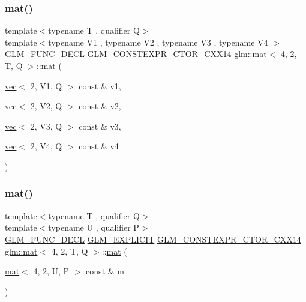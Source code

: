 \subsubsection{\texorpdfstring{mat()}{mat()}\hspace{0.1cm}{\footnotesize\ttfamily [8/21]}}
{\footnotesize\ttfamily template$<$typename T , qualifier Q$>$ \\
template$<$typename V1 , typename V2 , typename V3 , typename V4 $>$ \\
\mbox{\hyperlink{setup_8hpp_ab2d052de21a70539923e9bcbf6e83a51}{G\+L\+M\+\_\+\+F\+U\+N\+C\+\_\+\+D\+E\+CL}} \mbox{\hyperlink{setup_8hpp_a0900f9145e68bf6061b6f5e7be3fa751}{G\+L\+M\+\_\+\+C\+O\+N\+S\+T\+E\+X\+P\+R\+\_\+\+C\+T\+O\+R\+\_\+\+C\+X\+X14}} \mbox{\hyperlink{structglm_1_1mat}{glm\+::mat}}$<$ 4, 2, T, Q $>$\+::\mbox{\hyperlink{structglm_1_1mat}{mat}} (\begin{DoxyParamCaption}\item[{\mbox{\hyperlink{structglm_1_1vec}{vec}}$<$ 2, V1, Q $>$ const \&}]{v1,  }\item[{\mbox{\hyperlink{structglm_1_1vec}{vec}}$<$ 2, V2, Q $>$ const \&}]{v2,  }\item[{\mbox{\hyperlink{structglm_1_1vec}{vec}}$<$ 2, V3, Q $>$ const \&}]{v3,  }\item[{\mbox{\hyperlink{structglm_1_1vec}{vec}}$<$ 2, V4, Q $>$ const \&}]{v4 }\end{DoxyParamCaption})}

\mbox{\label{structglm_1_1mat_3_014_00_012_00_01_t_00_01_q_01_4_acae8a483921d714297536237a5f9013b}} 
\subsubsection{\texorpdfstring{mat()}{mat()}\hspace{0.1cm}{\footnotesize\ttfamily [9/21]}}
{\footnotesize\ttfamily template$<$typename T , qualifier Q$>$ \\
template$<$typename U , qualifier P$>$ \\
\mbox{\hyperlink{setup_8hpp_ab2d052de21a70539923e9bcbf6e83a51}{G\+L\+M\+\_\+\+F\+U\+N\+C\+\_\+\+D\+E\+CL}} \mbox{\hyperlink{setup_8hpp_a6c74f5a5e7b134ab69023ff9a30d4d5d}{G\+L\+M\+\_\+\+E\+X\+P\+L\+I\+C\+IT}} \mbox{\hyperlink{setup_8hpp_a0900f9145e68bf6061b6f5e7be3fa751}{G\+L\+M\+\_\+\+C\+O\+N\+S\+T\+E\+X\+P\+R\+\_\+\+C\+T\+O\+R\+\_\+\+C\+X\+X14}} \mbox{\hyperlink{structglm_1_1mat}{glm\+::mat}}$<$ 4, 2, T, Q $>$\+::\mbox{\hyperlink{structglm_1_1mat}{mat}} (\begin{DoxyParamCaption}\item[{\mbox{\hyperlink{structglm_1_1mat}{mat}}$<$ 4, 2, U, P $>$ const \&}]{m }\end{DoxyParamCaption})}

